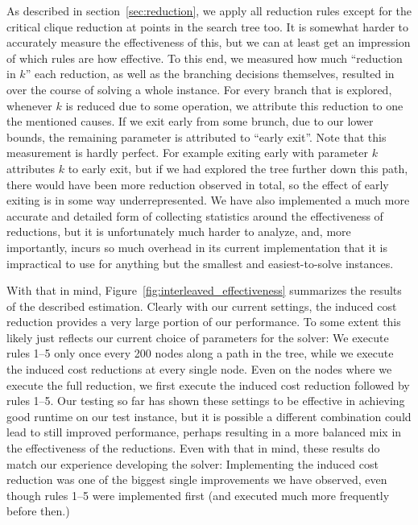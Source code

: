 \documentclass[12pt,oneside,english,parskip=full,headings=small]{scrbook}
\theoremstyle{definition}
\begin{document}
As described in section~\ref{sec:reduction}, we apply all reduction rules except for the critical
clique reduction at points in the search tree too. It is somewhat harder to accurately measure the
effectiveness of this, but we can at least get an impression of which rules are how effective. To
this end, we measured how much ``reduction in $k$'' each reduction, as well as the branching
decisions themselves, resulted in over the course of solving a whole instance. For every branch that
is explored, whenever $k$ is reduced due to some operation, we attribute this reduction to one the
mentioned causes. If we exit early from some brunch, due to our lower bounds, the remaining
parameter is attributed to ``early exit''. Note that this measurement is hardly perfect. For example
exiting early with parameter $k$ attributes $k$ to early exit, but if we had explored the tree
further down this path, there would have been more reduction observed in total, so the effect of
early exiting is in some way underrepresented. We have also implemented a much more accurate and
detailed form of collecting statistics around the effectiveness of reductions, but it is
unfortunately much harder to analyze, and, more importantly, incurs so much overhead in its current
implementation that it is impractical to use for anything but the smallest and easiest-to-solve
instances.

With that in mind, Figure~\ref{fig:interleaved_effectiveness} summarizes the results of the
described estimation. Clearly with our current settings, the induced cost reduction provides a very
large portion of our performance. To some extent this likely just reflects our current choice of
parameters for the solver: We execute rules 1--5 only once every 200 nodes along a path in the tree,
while we execute the induced cost reductions at every single node. Even on the nodes where we
execute the full reduction, we first execute the induced cost reduction followed by rules 1--5. Our
testing so far has shown these settings to be effective in achieving good runtime on our test
instance, but it is possible a different combination could lead to still improved performance,
perhaps resulting in a more balanced mix in the effectiveness of the reductions. Even with that in
mind, these results do match our experience developing the solver: Implementing the induced cost
reduction was one of the biggest single improvements we have observed, even though rules 1--5 were
implemented first (and executed much more frequently before then.)
\end{document}
